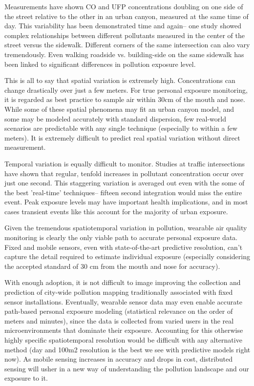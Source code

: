 Measurements have shown CO and UFP concentrations doubling on one side of the street relative to the other in an urban canyon, measured at the same time of day. This variability has been demonstrated time and again-- one study showed complex relationships between different pollutants measured in the center of the street versus the sidewalk. Different corners of the same intersection can also vary tremendously. Even walking roadside vs. building-side on the same sidewalk has been linked to significant differences in pollution exposure level.

This is all to say that spatial variation is extremely high.  Concentrations can change drastically over just a few meters.  For true personal exposure monitoring, it is regarded as best practice to sample air within 30cm of the mouth and nose. While some of these spatial phenomena may fit an urban canyon model, and some may be modeled accurately with standard dispersion, few real-world scenarios are predictable with any single technique (especially to within a few meters).  It is extremely difficult to predict real spatial variation without direct measurement. 

Temporal variation is equally difficult to monitor. Studies at traffic intersections have shown that regular, tenfold increases in pollutant concentration occur over just one second. This staggering variation is averaged out even with the some of the best 'real-time' techniques-- fifteen second integration would miss the entire event.  Peak exposure levels may have important health implications, and in most cases transient events like this account for the majority of urban exposure.

Given the tremendous spatiotemporal variation in pollution, wearable air quality monitoring is clearly the only viable path to accurate personal exposure data.  Fixed and mobile sensors, even with state-of-the-art predictive resolution, can't capture the detail required to estimate individual exposure (especially considering the accepted standard of 30 cm from the mouth and nose for accuracy). 

With enough adoption, it is not difficult to image improving the collection and prediction of city-wide pollution mapping traditionally associated with fixed sensor installations.  Eventually, wearable sensor data may even enable accurate path-based personal exposure modeling (statistical relevance on the order of meters and minutes), since the data is collected from varied users in the real microenvironments that dominate their exposure.  Accounting for this otherwise highly specific spatiotemporal resolution would be difficult with any alternative method (day and 100m2 resolution is the best we see with predictive models right now).  As mobile sensing increases in accuracy and drops in cost, distributed sensing will usher in a new way of understanding the pollution landscape and our exposure to it.


